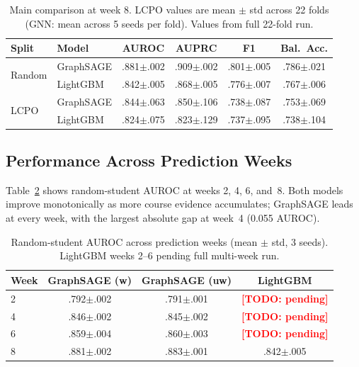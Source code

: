 \documentclass[sigconf,review]{acmart}
\newcommand{\todo}[1]{\textcolor{red}{\textbf{[TODO: #1]}}}
\newcommand{\fullrun}[1]{#1}  %
\begin{document}
\begin{table}[t]
  \centering
  \caption{Main comparison at week 8. LCPO values are mean $\pm$ std across
           22 folds (GNN: mean across 5 seeds per fold). \fullrun{Values
           from full 22-fold run.}}
  \label{tab:main}
  \small
  \setlength{\tabcolsep}{4pt}
  \begin{tabular}{llcccc}
    \toprule
    \textbf{Split} & \textbf{Model} & \textbf{AUROC} & \textbf{AUPRC} & \textbf{F1} & \textbf{Bal.\ Acc.} \\
    \midrule
    \multirow{2}{*}{Random}
      & GraphSAGE  & \fullrun{.881$\pm$.002} & \fullrun{.909$\pm$.002} & \fullrun{.801$\pm$.005} & \fullrun{.786$\pm$.021} \\
      & LightGBM   & \fullrun{.842$\pm$.005} & \fullrun{.868$\pm$.005} & \fullrun{.776$\pm$.007} & \fullrun{.767$\pm$.006} \\
    \midrule
    \multirow{2}{*}{LCPO}
      & GraphSAGE  & \fullrun{.844$\pm$.063} & \fullrun{.850$\pm$.106} & \fullrun{.738$\pm$.087} & \fullrun{.753$\pm$.069} \\
      & LightGBM   & \fullrun{.824$\pm$.075} & \fullrun{.823$\pm$.129} & \fullrun{.737$\pm$.095} & \fullrun{.738$\pm$.104} \\
    \bottomrule
  \end{tabular}
\end{table}

\subsection{Performance Across Prediction Weeks}
\label{sec:weeks}

Table~\ref{tab:weeks} shows random-student AUROC at weeks 2, 4, 6, and~8.
Both models improve monotonically as more course evidence accumulates;
GraphSAGE leads at every week, with the largest absolute gap at week~4
(\fullrun{0.055} AUROC).

\begin{table}[t]
  \centering
  \caption{Random-student AUROC across prediction weeks (mean $\pm$ std,
           3 seeds). LightGBM weeks 2--6 pending full multi-week run.}
  \label{tab:weeks}
  \small
  \begin{tabular}{lccc}
    \toprule
    \textbf{Week} & \textbf{GraphSAGE (w)} & \textbf{GraphSAGE (uw)} & \textbf{LightGBM} \\
    \midrule
    2 & \fullrun{.792$\pm$.002} & \fullrun{.791$\pm$.001} & \todo{pending} \\
    4 & \fullrun{.846$\pm$.002} & \fullrun{.845$\pm$.002} & \todo{pending} \\
    6 & \fullrun{.859$\pm$.004} & \fullrun{.860$\pm$.003} & \todo{pending} \\
    8 & \fullrun{.881$\pm$.002} & \fullrun{.883$\pm$.001} & \fullrun{.842$\pm$.005} \\
    \bottomrule
  \end{tabular}
\end{table}
\end{document}
